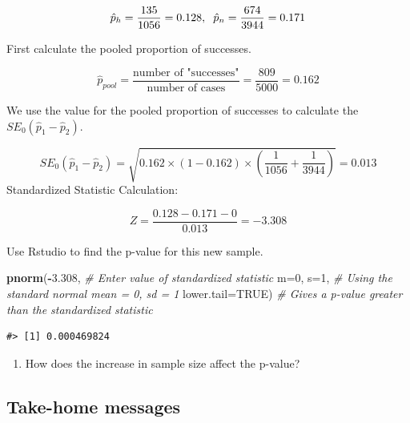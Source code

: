 \documentclass[
]{report}
\newenvironment{Shaded}{\begin{snugshade}}{\end{snugshade}}
\newcommand{\AttributeTok}[1]{\textcolor[rgb]{0.13,0.29,0.53}{#1}}
\newcommand{\CommentTok}[1]{\textcolor[rgb]{0.56,0.35,0.01}{\textit{#1}}}
\newcommand{\ConstantTok}[1]{\textcolor[rgb]{0.56,0.35,0.01}{#1}}
\newcommand{\DecValTok}[1]{\textcolor[rgb]{0.00,0.00,0.81}{#1}}
\newcommand{\FloatTok}[1]{\textcolor[rgb]{0.00,0.00,0.81}{#1}}
\newcommand{\FunctionTok}[1]{\textcolor[rgb]{0.13,0.29,0.53}{\textbf{#1}}}
\newcommand{\NormalTok}[1]{#1}
\newcommand{\SpecialCharTok}[1]{\textcolor[rgb]{0.81,0.36,0.00}{\textbf{#1}}}
\providecommand{\tightlist}{%
  \setlength{\itemsep}{0pt}\setlength{\parskip}{0pt}}
\begin{document}
\[\hat{p}_h = \frac{135}{1056}=0.128, \hspace{2mm} \hat{p}_n = \frac{674}{3944}=0.171\]

First calculate the pooled proportion of successes.

\[\hat{p}_{pool} = \frac{\text{number of "successes"}}{\text{number of cases}} = \frac{809}{5000} = 0.162\]

We use the value for the pooled proportion of successes to calculate the \(SE_0(\hat{p}_1 - \hat{p}_2)\).

\[
SE_0(\hat{p}_1-\hat{p}_2)=\sqrt{0.162 \times (1-0.162)\times \left(\frac{1}{1056}+\frac{1}{3944}\right)} = 0.013
\]
Standardized Statistic Calculation:

\[Z = \frac{0.128 - 0.171 - 0}{0.013} = -3.308\]

Use Rstudio to find the p-value for this new sample.

\begin{Shaded}
\begin{Highlighting}[]
\FunctionTok{pnorm}\NormalTok{(}\SpecialCharTok{{-}}\FloatTok{3.308}\NormalTok{, }\CommentTok{\# Enter value of standardized statistic}
      \AttributeTok{m=}\DecValTok{0}\NormalTok{, }\AttributeTok{s=}\DecValTok{1}\NormalTok{, }\CommentTok{\# Using the standard normal mean = 0, sd = 1}
      \AttributeTok{lower.tail=}\ConstantTok{TRUE}\NormalTok{) }\CommentTok{\# Gives a p{-}value greater than the standardized statistic}
\end{Highlighting}
\end{Shaded}

\begin{verbatim}
#> [1] 0.000469824
\end{verbatim}

\begin{enumerate}
\def\labelenumi{\arabic{enumi}.}
\setcounter{enumi}{9}
\tightlist
\item
  How does the increase in sample size affect the p-value?
\end{enumerate}

\vspace{0.4in}

\vspace{.8in}

\newpage

\subsection{Take-home messages}\label{take-home-messages-18}
\end{document}
